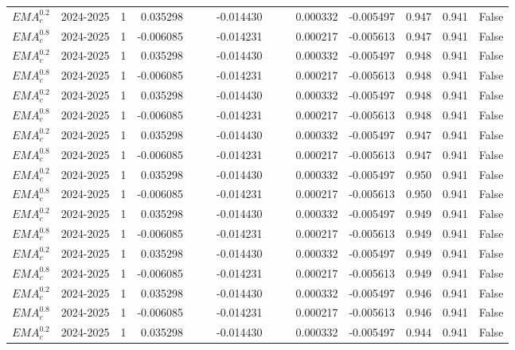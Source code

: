 \begin{tabular}{@{}llrrrrrrrrrlll@{}}
$EMA^{0.2}_{c}$ & 2024-2025 & 1 & 0.035298 &  &  & -0.014430 &  &  & 0.000332 & -0.005497 & 0.947 & 0.941 & False \\
$EMA^{0.8}_{c}$ & 2024-2025 & 1 & -0.006085 &  &  & -0.014231 &  &  & 0.000217 & -0.005613 & 0.947 & 0.941 & False \\
$EMA^{0.2}_{c}$ & 2024-2025 & 1 & 0.035298 &  &  & -0.014430 &  &  & 0.000332 & -0.005497 & 0.948 & 0.941 & False \\
$EMA^{0.8}_{c}$ & 2024-2025 & 1 & -0.006085 &  &  & -0.014231 &  &  & 0.000217 & -0.005613 & 0.948 & 0.941 & False \\
$EMA^{0.2}_{c}$ & 2024-2025 & 1 & 0.035298 &  &  & -0.014430 &  &  & 0.000332 & -0.005497 & 0.948 & 0.941 & False \\
$EMA^{0.8}_{c}$ & 2024-2025 & 1 & -0.006085 &  &  & -0.014231 &  &  & 0.000217 & -0.005613 & 0.948 & 0.941 & False \\
$EMA^{0.2}_{c}$ & 2024-2025 & 1 & 0.035298 &  &  & -0.014430 &  &  & 0.000332 & -0.005497 & 0.947 & 0.941 & False \\
$EMA^{0.8}_{c}$ & 2024-2025 & 1 & -0.006085 &  &  & -0.014231 &  &  & 0.000217 & -0.005613 & 0.947 & 0.941 & False \\
$EMA^{0.2}_{c}$ & 2024-2025 & 1 & 0.035298 &  &  & -0.014430 &  &  & 0.000332 & -0.005497 & 0.950 & 0.941 & False \\
$EMA^{0.8}_{c}$ & 2024-2025 & 1 & -0.006085 &  &  & -0.014231 &  &  & 0.000217 & -0.005613 & 0.950 & 0.941 & False \\
$EMA^{0.2}_{c}$ & 2024-2025 & 1 & 0.035298 &  &  & -0.014430 &  &  & 0.000332 & -0.005497 & 0.949 & 0.941 & False \\
$EMA^{0.8}_{c}$ & 2024-2025 & 1 & -0.006085 &  &  & -0.014231 &  &  & 0.000217 & -0.005613 & 0.949 & 0.941 & False \\
$EMA^{0.2}_{c}$ & 2024-2025 & 1 & 0.035298 &  &  & -0.014430 &  &  & 0.000332 & -0.005497 & 0.949 & 0.941 & False \\
$EMA^{0.8}_{c}$ & 2024-2025 & 1 & -0.006085 &  &  & -0.014231 &  &  & 0.000217 & -0.005613 & 0.949 & 0.941 & False \\
$EMA^{0.2}_{c}$ & 2024-2025 & 1 & 0.035298 &  &  & -0.014430 &  &  & 0.000332 & -0.005497 & 0.946 & 0.941 & False \\
$EMA^{0.8}_{c}$ & 2024-2025 & 1 & -0.006085 &  &  & -0.014231 &  &  & 0.000217 & -0.005613 & 0.946 & 0.941 & False \\
$EMA^{0.2}_{c}$ & 2024-2025 & 1 & 0.035298 &  &  & -0.014430 &  &  & 0.000332 & -0.005497 & 0.944 & 0.941 & False \\

\end{tabular}
